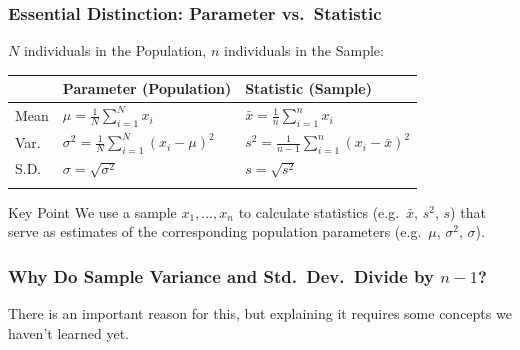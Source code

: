 \begin{frame}

\frametitle{Essential Distinction: Parameter vs.\ Statistic}
$N$ individuals in the Population, $n$ individuals in the Sample:

\vspace{1em}
\small
\begin{tabular}{l|l|l}
	&\textbf{Parameter} (Population)&\textbf{Statistic} (Sample)\\
	\hline
	Mean&$\displaystyle\mu = \frac{1}{N} \sum_{i=1}^N x_i$& $\displaystyle\bar{x} = \frac{1}{n} \sum_{i=1}^n x_i$ \\
	Var.\ &$\displaystyle \sigma^2 = \frac{1}{N}\sum_{i=1}^N (x_i - \mu)^2$ &$\displaystyle s^2 = \frac{1}{n-1}\sum_{i=1}^n(x_i - \bar{x})^2$\\
	S.D.\ &$\sigma = \sqrt{\sigma^2}$ &$s = \sqrt{s^2}$ \\
	&&
\end{tabular}

\vspace{2em}
\begin{alertblock}{Key Point}
We  use a \alert{sample} $x_1, \hdots, x_n$ to calculate \alert{statistics} (e.g.\ $\bar{x}$, $s^2$, $s$) that serve as \alert{estimates} of the corresponding population \alert{parameters} (e.g.\ $\mu$, $\sigma^2$, $\sigma$).
\end{alertblock}
\end{frame}
\begin{frame}
\frametitle{Why Do Sample Variance and Std.\ Dev.\ Divide by $n-1$? }
\footnotesize
{}
\normalsize

\vspace{3em}
\alert{There is an important reason for this, but explaining it requires some concepts we haven't learned yet. }

\end{frame}

